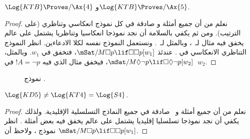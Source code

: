 \documentclass[../../../include/open-logic-section]{subfiles}
\begin{document}
\begin{thm}
  $\Log{KTB} \Proves/ \Ax{4}$ و$\Log{KTB} \Proves/ \Ax{5}$.
\end{thm}

\begin{proof}
  نعلم من  أن جميع أمثلة 
  و صادقة في كل نموذج انعكاسي وتناظري (على الترتيب). ومن ثم
  يكفي بالسلامة أن نجد نموذجا انعكاسيا وتناظريا يشتمل على عالم يخفق
  فيه مثال لـ~، وبالمثل لـ~. ونستعمل النموذج نفسه لكلا
  الادعاءين. انظر النموذج التناظري الانعكاسي في
  . عندئذ
  $\mSat/{M}{\Box p \lif \Box \Box p}[w_1]$، فتخفق  في $w_1$.
  وبالمثل، $\mSat/{M}{\Diamond \lnot p \lif \Box \Diamond \lnot
    p}[w_2]$، فيخفق مثال  الذي فيه $!A = \lnot p$ في~$w_2$.
\end{proof}

\begin{figure}[htpb]
  \centering
  \caption{نموذج .}
\end{figure}

\begin{thm}
  $\Log{KD5} \neq \Log{KT4} = \Log{S4}$.
\end{thm}

\begin{proof}
  نعلم من  أن جميع أمثلة 
  و~ صادقة في جميع النماذج التسلسلية الإقليدية. ولذلك يكفي أن
  نجد نموذجا تسلسليا إقليديا يشتمل على عالم يخفق فيه بعض أمثلة
  . انظر نموذج ، ولاحظ أن
  $\mSat/{M}{\Box p \lif \Box\Box p}[w_1]$.
\end{proof}
\end{document}
